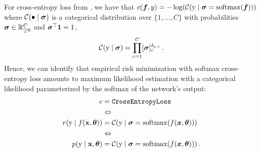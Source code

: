\begin{example}\label{ex:cross_entropy_loss_probabilistic}
  For cross-entropy loss from , we have that $c({\bm{f}}, y) = - \log( {\mathcal{C}}({\textnormal{y}} \mid {\bm{\sigma}} = \mathrm{softmax}({\bm{f}}) ))$ where ${\mathcal{C}}(\bullet \mid {\bm{\sigma}})$ is a categorical distribution over $\{1, \dots, C\}$ with probabilities ${\bm{\sigma}} \in {\mathbb{R}}^C_{\ge 0}$ and ${\bm{\sigma}}^\top {\bm{1}} = 1$,
  \begin{align*}
    {\mathcal{C}}({\textnormal{y}} \mid {\bm{\sigma}})
    =
    \prod_{c=1}^C [{\bm{\sigma}}]_c^{\delta_{{\textnormal{y}},c}}\,.
  \end{align*}
  Hence, we can identify that empirical risk minimization with softmax cross-entropy loss amounts to maximum likelihood estimation with a categorical likelihood parameterized by the softmax of the network's output:
  \begin{align*}
    c                             & = \text{\texttt{CrossEntropyLoss}}
    \\
                                  & \Leftrightarrow
    \\
    r({\textnormal{y}} \mid f({\mathbf{x}}, {\bm{\theta}})) & = {\mathcal{C}}({\textnormal{y}} \mid {\bm{\sigma}} = \mathrm{softmax}(f({\bm{x}}, {\bm{\theta}})))\,
    \\
                                  & \Leftrightarrow
    \\
    p({\textnormal{y}} \mid {\mathbf{x}}, {\bm{\theta}})    & = {\mathcal{C}}({\textnormal{y}} \mid {\bm{\sigma}} = \mathrm{softmax}(f({\bm{x}}, {\bm{\theta}})))\,.
  \end{align*}
\end{example}

\switchcolumn[0]
